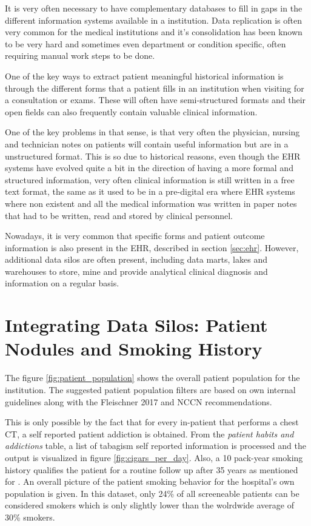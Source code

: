 It is very often necessary to have complementary databases to fill in gaps in the different information systems available in a institution. Data replication is often very common for the medical institutions and it's consolidation has been known to be very hard and sometimes even department or condition specific, often requiring manual work steps to be done.

One of the key ways to extract patient meaningful historical information is through the different forms that a patient fills in an institution when visiting for a consultation or exams. These will often have semi-structured formats and their open fields can also frequently contain valuable clinical information. 

One of the key problems in that sense, is that very often the physician, nursing and technician notes on patients will contain useful information but are in a unstructured format. This is so due to historical reasons, even though the EHR systems have evolved quite a bit in the direction of having a more formal and structured information, very often clinical information is still written in a free text format, the same as it used to be in a pre-digital era where EHR systems where non existent and all the medical information was written in paper notes that had to be written, read and stored by clinical personnel.

Nowadays, it is very common that specific forms and patient outcome information is also present in the EHR, described in section \ref{sec:ehr}. However, additional data silos are often present, including data marts, lakes and warehouses to store, mine and provide analytical clinical diagnosis and information on a regular basis.

\section{Integrating Data Silos: Patient Nodules and Smoking History}

The figure \ref{fig:patient_population} shows the overall patient population for the institution. The suggested patient population filters are based on \nomeHslShort{} own internal guidelines along with the Fleischner 2017 and NCCN recommendations.

This is only possible by the fact that for every in-patient that performs a chest CT, a self reported patient addiction is obtained. From the \emph{patient habits and addictions} table, a list of tabagism self reported information is processed and the output is visualized in figure \ref{fig:cigars_per_day}.
Also, a 10 pack-year smoking history qualifies the patient for a routine follow up after 35 years as mentioned for \nomeHslShort{}. An overall picture of the patient smoking behavior for the hospital's own population is given. In this dataset, only 24\% of all screeneable patients can be considered smokers which is only slightly lower than the wolrdwide average of 30\% smokers.

